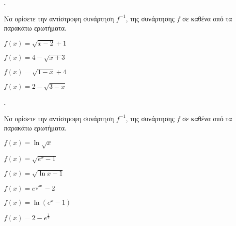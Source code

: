 \documentclass[11pt,a4paper,twocolumn]{article}
\newcounter{askhsh}
\newcommand{\askhsh}{\large\theaskhsh.\ \addtocounter{askhsh}{1}}
\begin{document}
\askhsh Να ορίσετε την αντίστροφη συνάρτηση $f^{-1}$, της συνάρτησης $f$ σε καθένα από τα παρακάτω ερωτήματα.
\begin{alist}
\begin{multicols}{2}
\item $f(x)=\sqrt{x-2}+1$
\item $f(x)=4-\sqrt{x+3}$
\item $f(x)=\sqrt{1-x}+4$
\item $ f(x)=2-\sqrt{3-x}$
\end{multicols}
\end{alist}

\askhsh Να ορίσετε την αντίστροφη συνάρτηση $f^{-1}$, της συνάρτησης $f$ σε καθένα από τα παρακάτω ερωτήματα.
\begin{alist}
\begin{multicols}{2}
\item $f(x)=\ln{\sqrt{x}}$
\item $f(x)=\sqrt{e^x-1}$
\item $f(x)=\sqrt{\ln{x}+1}$
\item $f(x)=e^{\sqrt{x}}-2$
\item $f(x)=\ln{\left(e^x-1\right)}$
\item $f(x)=2-e^{\frac{1}{x}}$
\end{multicols}
\end{alist}
\end{document}
